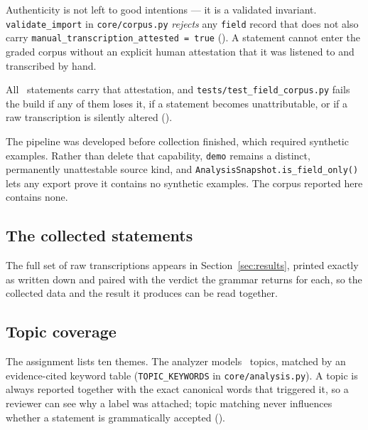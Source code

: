 Authenticity is not left to good intentions --- it is a validated invariant.
\texttt{validate\_import} in \texttt{core/corpus.py} \emph{rejects} any \texttt{field}
record that does not also carry \texttt{manual\_transcription\_attested = true}
(). A statement cannot enter the graded corpus without an explicit human
attestation that it was listened to and transcribed by hand.

All \CorpusAttested\ statements carry that attestation, and
\texttt{tests/test\_field\_corpus.py} fails the build if any of them loses it, if a
statement becomes unattributable, or if a raw transcription is silently altered
().

\begin{keypoint}
The pipeline was developed before collection finished, which required synthetic examples.
Rather than delete that capability, \texttt{demo} remains a distinct, permanently
unattestable source kind, and \texttt{AnalysisSnapshot.is\_field\_only()} lets any export
prove it contains no synthetic examples. The corpus reported here contains none.
\end{keypoint}

\subsection{The collected statements}

The full set of raw transcriptions appears in Section~\ref{sec:results}, printed exactly
as written down and paired with the verdict the grammar returns for each, so the collected
data and the result it produces can be read together.

\subsection{Topic coverage}

The assignment lists ten themes. The analyzer models \TopicCount\ topics, matched by an
evidence-cited keyword table (\texttt{TOPIC\_KEYWORDS} in \texttt{core/analysis.py}). A
topic is always reported together with the exact canonical words that triggered it, so a
reviewer can see why a label was attached; topic matching never influences whether a
statement is grammatically accepted ().

